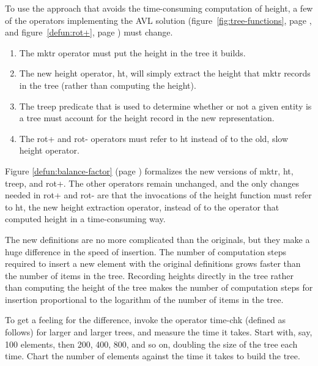 To use the approach that avoids
the time-consuming computation of height,
a few of the operators implementing the AVL solution
(figure~\ref{fig:tree-functions}, page \pageref{fig:tree-functions}, and
figure~\ref{defun:rot+}, page \pageref{defun:rot+})
must change.

\begin{enumerate}
\item The \textsf{mktr} operator must put the height in the tree it builds.
\item The new height operator, \textsf{ht},
      will simply extract the height that \textsf{mktr}
      records in the tree (rather than computing the height).
\item The \textsf{treep} predicate that is used to determine whether or not
      a given entity is a tree must account for the
      height record in the new representation.
\item The \textsf{rot}+ and \textsf{rot-} operators must refer to \textsf{ht}
      instead of to the old, slow \textsf{height} operator.
\end{enumerate}

Figure \ref{defun:balance-factor} (page \pageref{defun:balance-factor})
formalizes the new versions of
\textsf{mktr}, \textsf{ht}, \textsf{treep}, and \textsf{rot}+.
The other operators remain unchanged,
and the only changes needed in \textsf{rot}+ and \textsf{rot-}
are that the invocations of the height function
must refer to \textsf{ht},
the new height extraction operator,
instead of to the operator that computed height
in a time-consuming way.

The new definitions are no more complicated than the originals,
but they make a huge difference in the speed of insertion.
The number of computation steps required to insert a new
element with the original definitions grows faster than
the number of items in the tree.
Recording heights directly in the tree
rather than computing the height of the tree
makes the number of computation
steps for insertion proportional to the logarithm of
the number of items in the tree.

To get a feeling for the difference, invoke the operator time-chk
(defined as follows) for larger and larger trees,
and measure the time it takes.
Start with, say, 100 elements, then 200, 400, 800, and
so on, doubling the size of the tree each time.
Chart the number of elements against
the time it takes to build the tree.

